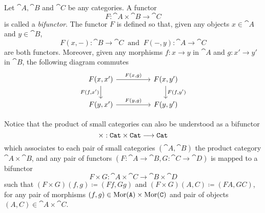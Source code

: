 \begin{proposition}[Bifunctor]\label{def:bifunctor}
Let \(\cat A, \cat B\) and \(\cat C\) be any categories. A functor
\[
  F: \cat A \times \cat B \longrightarrow \cat C
\]
is called a \emph{bifunctor}. The functor \(F\) is defined so that, given any
objects \(x \in \cat A\) and \(y \in \cat B\),
\[
  F(x, -): \cat B \longrightarrow \cat C\ \text{ and }\
  F(-, y): \cat A \longrightarrow \cat C
\]
are both functors. Moreover, given any morphisms \(f: x \to y\) in \(\cat A\)
and \(g: x' \to y'\) in \(\cat B\), the following diagram commutes
\[
  \begin{tikzcd}
    F(x, x') \ar[rr, "F{(x, g)}"] \ar[d, swap, "F{(f, x')}"]
      & &F(x, y') \ar[d, "F{(f, y')}"] \\
    F(y, x') \ar[rr, "F{(y, g)}"]
      & &F(y, y')
  \end{tikzcd}
\]
\end{proposition}

Notice that the product of small categories can also be understood as a
bifunctor
\[
\times: {\texttt{Cat}} \times {\texttt{Cat}} \longrightarrow {\texttt{Cat}}
\]
which associates to each pair of small categories \((\cat A, \cat B)\) the
product category \(\cat A \times \cat B\), and any pair of functors
\((F: \cat A \to \cat B, G: \cat C \to \cat D)\) is mapped to a bifunctor
\[
F \times G: \cat A \times \cat C \to \cat B \times \cat D
\]
such that \((F \times G)(f, g) \coloneq (F f, G g)\) and
\((F \times G)(A, C) \coloneq (F A, G C)\), for any pair of morphisms
\((f, g) \in \operatorname{Mor}(\texttt A) \times \operatorname{Mor}(\texttt C)\) and pair of objects
\((A, C) \in \cat A \times \cat C\).

